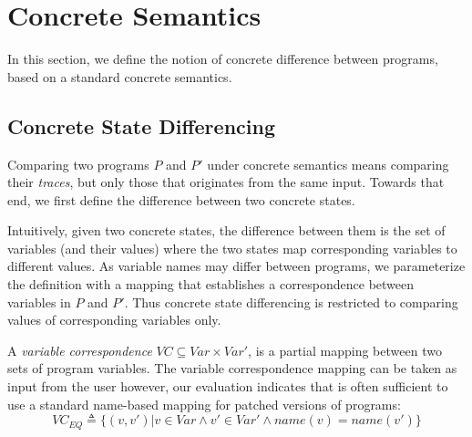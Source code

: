 \section{Concrete Semantics}
In this section, we define the notion of concrete difference between programs, based on a standard concrete semantics.

\subsection{Concrete State Differencing}
Comparing two programs $P$ and $P'$ under concrete semantics means comparing their \emph{traces}, but only those that originates from the same input. Towards that end, we first define the difference between two concrete states.

Intuitively, given two concrete states, the difference between them is the set of variables (and their values) where the two states map corresponding variables to different values. As variable names may differ between programs, we parameterize the definition with a mapping that establishes a correspondence between variables in $P$ and $P'$. Thus concrete state differencing is restricted to comparing values of corresponding variables only.

A \emph{variable correspondence} $VC \subseteq Var \times Var'$, is a partial mapping between two sets of program variables. The variable correspondence mapping can be taken as input from the user however, our evaluation indicates that is often sufficient to use a standard name-based mapping for patched versions of programs:  
\[
VC_{EQ} \triangleq \{(v,v') | v \in Var \wedge v' \in Var' \wedge name(v) = name(v')\}
\]





